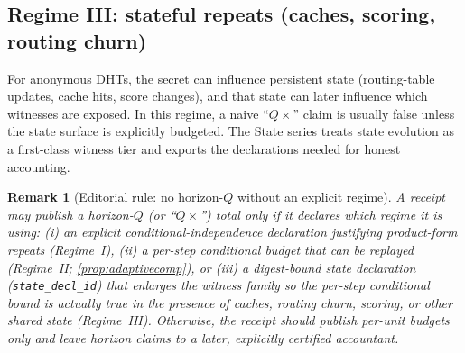 \documentclass[11pt]{article}
\newtheorem{remark}{Remark}
\begin{document}
\subsection{Regime III: stateful repeats (caches, scoring, routing churn)}
For anonymous DHTs, the secret can influence persistent state (routing-table updates, cache hits, score changes), and that state can later influence which witnesses are exposed.
In this regime, a naive ``$Q\times$'' claim is usually false unless the state surface is explicitly budgeted.
The State series treats state evolution as a first-class witness tier and exports the declarations needed for honest accounting.\cite{series:state1}

\begin{remark}[Editorial rule: no horizon-$Q$ without an explicit regime]
A receipt may publish a horizon-$Q$ (or ``$Q\times$'') total only if it declares which regime it is using:
(i) an explicit conditional-independence declaration justifying product-form repeats (Regime~I),
(ii) a per-step conditional budget that can be replayed (Regime~II; \cref{prop:adaptivecomp}), or
(iii) a digest-bound state declaration (\texttt{state\_decl\_id}) that enlarges the witness family so the per-step conditional bound is actually true in the presence of caches, routing churn, scoring, or other shared state (Regime~III).\cite{series:planstateequiv,series:state1}
Otherwise, the receipt should publish per-unit budgets only and leave horizon claims to a later, explicitly certified accountant.
\end{remark}
\end{document}
